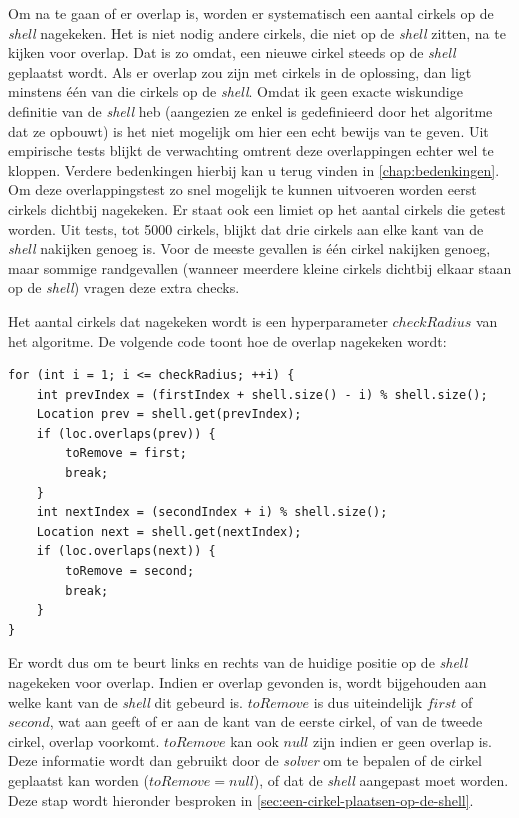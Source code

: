 \documentclass[12pt,a4paper,oneside]{book}
\begin{document}
{Om na te gaan of er overlap is, worden er systematisch een aantal cirkels op de \textit{shell} nagekeken.
Het is niet nodig andere cirkels, die niet op de \textit{shell} zitten, na te kijken voor overlap. %
Dat is zo omdat, een nieuwe cirkel steeds op de \textit{shell} geplaatst wordt. Als er overlap zou zijn met cirkels in de oplossing, dan ligt minstens één van die cirkels op de \textit{shell}.
Omdat ik geen exacte wiskundige definitie van de \textit{shell} heb (aangezien ze enkel is gedefinieerd door het algoritme dat ze opbouwt) is het niet mogelijk om hier een echt bewijs van te geven. %
Uit empirische tests blijkt de verwachting omtrent deze overlappingen echter wel te kloppen.
Verdere bedenkingen hierbij kan u terug vinden in \autoref{chap:bedenkingen}.
Om deze overlappingstest zo snel mogelijk te kunnen uitvoeren worden eerst cirkels dichtbij nagekeken.
Er staat ook een limiet op het aantal cirkels die getest worden.
Uit tests, tot 5000 cirkels, blijkt dat drie cirkels aan elke kant van de \textit{shell} nakijken genoeg is.
Voor de meeste gevallen is één cirkel nakijken genoeg, maar sommige randgevallen (wanneer meerdere kleine cirkels dichtbij elkaar staan op de \textit{shell}) vragen deze extra checks.

Het aantal cirkels dat nagekeken wordt is een hyperparameter $checkRadius$ van het algoritme.
De volgende code toont hoe de overlap nagekeken wordt:

\begin{lstlisting}
for (int i = 1; i <= checkRadius; ++i) {
	int prevIndex = (firstIndex + shell.size() - i) % shell.size();
	Location prev = shell.get(prevIndex);
	if (loc.overlaps(prev)) {
		toRemove = first;
		break;
	}
	int nextIndex = (secondIndex + i) % shell.size();
	Location next = shell.get(nextIndex);
	if (loc.overlaps(next)) {
		toRemove = second;
		break;
	}
}
\end{lstlisting}

Er wordt dus om te beurt links en rechts van de huidige positie op de \textit{shell} nagekeken voor overlap.
Indien er overlap gevonden is, wordt bijgehouden aan welke kant van de \textit{shell} dit gebeurd is.
$toRemove$ is dus uiteindelijk $first$ of $second$, wat aan geeft of er aan de kant van de eerste cirkel, of van de tweede cirkel, overlap voorkomt.
$toRemove$ kan ook $null$ zijn indien er geen overlap is.
Deze informatie wordt dan gebruikt door de \textit{solver} om te bepalen of de cirkel geplaatst kan worden ($toRemove = null$), of dat de \textit{shell} aangepast moet worden. Deze stap wordt hieronder besproken in \autoref{sec:een-cirkel-plaatsen-op-de-shell}.

}
\end{document}
